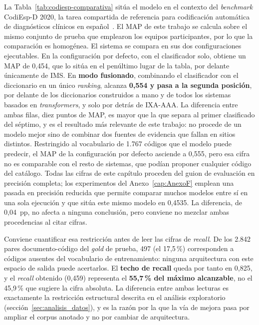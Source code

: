 La Tabla~\ref{tab:codiesp-comparativa} sitúa el modelo en el contexto del \emph{benchmark} CodiEsp-D 2020, la tarea compartida de referencia para codificación automática de diagnósticos clínicos en español~\cite{miranda2020}. El MAP de este trabajo se calcula sobre el mismo conjunto de prueba que emplearon los equipos participantes, por lo que la comparación es homogénea. El sistema se compara en sus dos configuraciones ejecutables. En la configuración por defecto, con el clasificador solo, obtiene un MAP de 0,454, que lo sitúa en el penúltimo lugar de la tabla, por delante únicamente de IMS. En \textbf{modo fusionado}, combinando el clasificador con el diccionario en un único \emph{ranking}, alcanza \textbf{0,554 y pasa a la segunda posición}, por delante de los diccionarios construidos a mano y de todos los sistemas basados en \emph{transformers}, y solo por detrás de IXA-AAA. La diferencia entre ambas filas, diez puntos de MAP, es mayor que la que separa al primer clasificado del séptimo, y es el resultado más relevante de este trabajo: no procede de un modelo mejor sino de combinar dos fuentes de evidencia que fallan en sitios distintos. Restringido al vocabulario de 1.767 códigos que el modelo puede predecir, el MAP de la configuración por defecto asciende a 0,555, pero esa cifra no es comparable con el resto de sistemas, que podían proponer cualquier código del catálogo. Todas las cifras de este capítulo proceden del guion de evaluación en precisión completa; los experimentos del Anexo~\ref{cap:AnexoF} emplean una pasada en precisión reducida que permite comparar muchos modelos entre sí en una sola ejecución y que sitúa este mismo modelo en 0{,}4535. La diferencia, de 0{,}04~pp, no afecta a ninguna conclusión, pero conviene no mezclar ambas procedencias al citar cifras.

Conviene cuantificar esa restricción antes de leer las cifras de \emph{recall}. De los 2.842 pares documento-código del \emph{gold} de prueba, 497 (el 17,5\,\%) corresponden a códigos ausentes del vocabulario de entrenamiento: ninguna arquitectura con este espacio de salida puede acertarlos. El \textbf{techo de recall} queda por tanto en 0,825, y el \emph{recall} obtenido (0,459) representa el \textbf{55,7\,\% del máximo alcanzable}, no el 45,9\,\% que sugiere la cifra absoluta. La diferencia entre ambas lecturas es exactamente la restricción estructural descrita en el análisis exploratorio (sección~\ref{sec:analisis_datos}), y es la razón por la que la vía de mejora pasa por ampliar el corpus anotado y no por cambiar de arquitectura.

